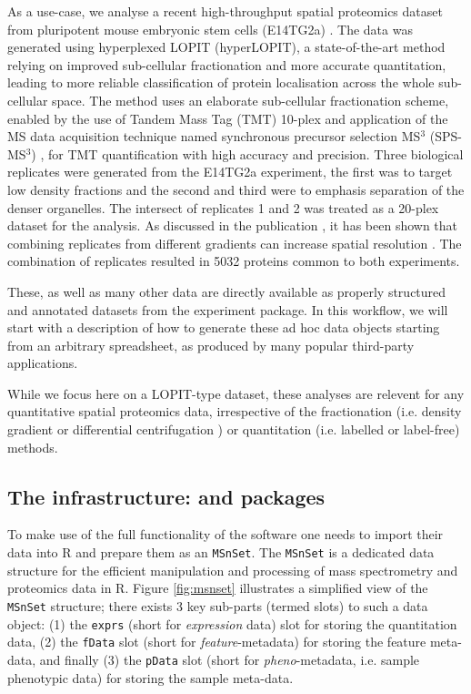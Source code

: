 As a use-case, we analyse a recent high-throughput spatial proteomics
dataset from pluripotent mouse embryonic stem cells (E14TG2a)
\cite{hyper}. The data was generated using hyperplexed LOPIT
(hyperLOPIT), a state-of-the-art method relying on improved
sub-cellular fractionation and more accurate quantitation, leading to
more reliable classification of protein localisation across the whole
sub-cellular space. The method uses an elaborate sub-cellular
fractionation scheme, enabled by the use of Tandem Mass Tag (TMT)
\cite{Thompson:2003} 10-plex and application of the MS data
acquisition technique named synchronous precursor selection MS$^3$
(SPS-MS$^3$) \cite{McAlister:2014}, for TMT quantification with high
accuracy and precision. Three biological replicates were generated
from the E14TG2a experiment, the first was to target low density
fractions and the second and third were to emphasis separation of the
denser organelles.  The intersect of replicates 1 and 2 was treated as
a 20-plex dataset for the analysis.  As discussed in the publication
\cite{hyper}, it has been shown that combining replicates from
different gradients can increase spatial resolution
\cite{Trotter:2010}. The combination of replicates resulted in 5032
proteins common to both experiments.

These, as well as many other data are directly available as properly
structured and annotated datasets from the 
experiment package. In this workflow, we will start with a description
of how to generate these ad hoc data objects starting from an
arbitrary spreadsheet, as produced by many popular third-party
applications.

While we focus here on a LOPIT-type dataset, these analyses are
relevent for any quantitative spatial proteomics data,
irrespective of the fractionation (i.e. density gradient or
differential centrifugation \cite{Itzhak:2016}) or quantitation
(i.e. labelled or label-free) methods.

\subsection*{The infrastructure:  and  packages}

To make use of the full functionality of the  software
one needs to import their data into R and prepare them as an
\texttt{MSnSet}. The \texttt{MSnSet} is a dedicated data structure for
the efficient manipulation and processing of mass spectrometry and
proteomics data in R. Figure \ref{fig:msnset} illustrates a simplified view of the
\texttt{MSnSet} structure; there exists 3 key sub-parts (termed slots)
to such a data object: (1) the \texttt{exprs} (short for
\textit{expression} data) slot for storing the quantitation data, (2)
the \texttt{fData} slot (short for \textit{feature}-metadata) for
storing the feature meta-data, and finally (3) the \texttt{pData} slot
(short for \textit{pheno}-metadata, i.e. sample phenotypic data) for
storing the sample meta-data.

